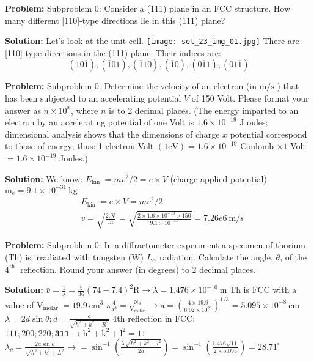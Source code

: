 \documentclass[10pt]{article}
\begin{document}
\textbf{Problem:}
Subproblem 0: Consider a (111) plane in an FCC structure. How many different [110]-type directions lie in this (111) plane?


\textbf{Solution:}
Let's look at the unit cell.
\texttt{[image: set\_23\_img\_01.jpg]}
\nonessentialimage
There are  [110]-type directions in the (111) plane. Their indices are:
\[
(10 \overline{1}),(\overline{1} 01),(\overline{1} 10),(\overline{1} 0),(0 \overline{1} 1),(01 \overline{1})
\]


\textbf{Problem:}
Subproblem 0: Determine the velocity of an electron (in $\mathrm{m} / \mathrm{s}$ ) that has been subjected to an accelerating potential $V$ of 150 Volt. Please format your answer as $n \times 10^x$, where $n$ is to 2 decimal places. 
(The energy imparted to an electron by an accelerating potential of one Volt is $1.6 \times 10^{-19}$ J oules; dimensional analysis shows that the dimensions of charge $x$ potential correspond to those of energy; thus: 1 electron Volt $(1 \mathrm{eV})=1.6 \times 10^{-19}$ Coulomb $\times 1$ Volt $=1.6 \times 10^{-19}$ Joules.)


\textbf{Solution:}
We know: $E_{\text {kin }}=m v^{2} / 2=e \times V$ (charge applied potential) $\mathrm{m}_{\mathrm{e}}=9.1 \times 10^{-31} \mathrm{~kg}$
\[
\begin{aligned}
&E_{\text {kin }}=e \times V=m v^{2} / 2 \\
&v=\sqrt{\frac{2 \mathrm{eV}}{\mathrm{m}}}=\sqrt{\frac{2 \times 1.6 \times 10^{-19} \times 150}{9.1 \times 10^{-31}}}=\boxed{7.26e6} \mathrm{~m} / \mathrm{s}
\end{aligned}
\]


\textbf{Problem:}
Subproblem 0: In a diffractometer experiment a specimen of thorium (Th) is irradiated with tungsten (W) $L_{\alpha}$ radiation. Calculate the angle, $\theta$, of the $4^{\text {th }}$ reflection. Round your answer (in degrees) to 2 decimal places.


\textbf{Solution:}
$\bar{v}=\frac{1}{\lambda}=\frac{5}{36}(74-7.4)^{2} \mathrm{R} \rightarrow \lambda=1.476 \times 10^{-10} \mathrm{~m}$
Th is FCC with a value of $\mathrm{V}_{\text {molar }}=19.9 \mathrm{~cm}^{3}$
$\therefore \frac{4}{\mathrm{a}^{3}}=\frac{\mathrm{N}_{\mathrm{A}}}{\mathrm{V}_{\text {molar }}} \rightarrow \mathrm{a}=\left(\frac{4 \times 19.9}{6.02 \times 10^{23}}\right)^{1 / 3}=5.095 \times 10^{-8} \mathrm{~cm}$
$\lambda=2 d \sin \theta ; d=\frac{a}{\sqrt{h^{2}+k^{2}+R^{2}}}$
4th reflection in FCC: $111 ; 200 ; 220 ; \mathbf{3 1 1} \rightarrow \mathrm{h}^{2}+\mathrm{k}^{2}+\mathrm{l}^{2}=11$
$\lambda_{\theta}=\frac{2 a \sin \theta}{\sqrt{h^{2}+k^{2}+L^{2}}} \rightarrow=\sin ^{-1}\left(\frac{\lambda \sqrt{h^{2}+k^{2}+l^{2}}}{2 a}\right)=\sin ^{-1}\left(\frac{1.476 \sqrt{11}}{2 \times 5.095}\right)=\boxed{28.71}^{\circ}$
\end{document}

